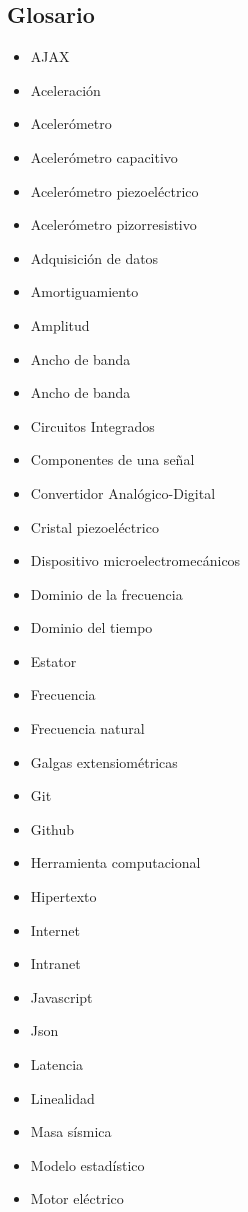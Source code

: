 
\subsection{Glosario}

\begin{itemize}
    \item AJAX
    \item Aceleración
    \item Acelerómetro
    \item Acelerómetro capacitivo
    \item Acelerómetro piezoeléctrico
    \item Acelerómetro pizorresistivo
    \item Adquisición de datos
    \item Amortiguamiento
    \item Amplitud
    \item Ancho de banda
    \item Ancho de banda
    \item Circuitos Integrados
    \item Componentes de una señal
    \item Convertidor Analógico-Digital
    \item Cristal piezoeléctrico
    \item Dispositivo microelectromecánicos
    \item Dominio de la frecuencia
    \item Dominio del tiempo
    \item Estator
    \item Frecuencia
    \item Frecuencia natural
    \item Galgas extensiométricas
    \item Git
    \item Github
    \item Herramienta computacional
    \item Hipertexto
    \item Internet
    \item Intranet
    \item Javascript
    \item Json
    \item Latencia
    \item Linealidad
    \item Masa sísmica
    \item Modelo estadístico
    \item Motor eléctrico

\end{itemize}
